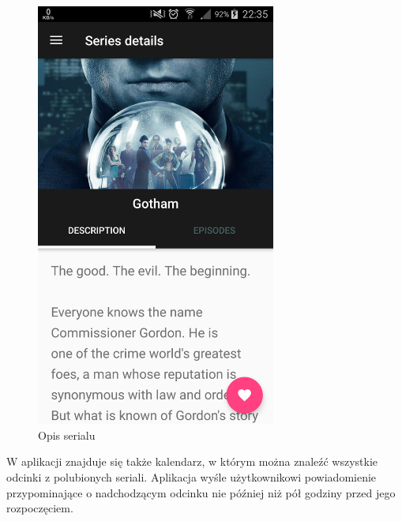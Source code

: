 \documentclass[10pt,a4paper]{article}
\begin{document}
\begin{figure}[H]
	\centering
	\includegraphics[height=14cm]{Resources/Images/details.png}
	\caption{Opis serialu}
\end{figure}
\noindent
W aplikacji znajduje się także kalendarz, w którym można znaleźć wszystkie odcinki z polubionych seriali. Aplikacja wyśle użytkownikowi powiadomienie przypominające o nadchodzącym odcinku nie później niż pół godziny przed jego rozpoczęciem.

\newpage
\end{document}
